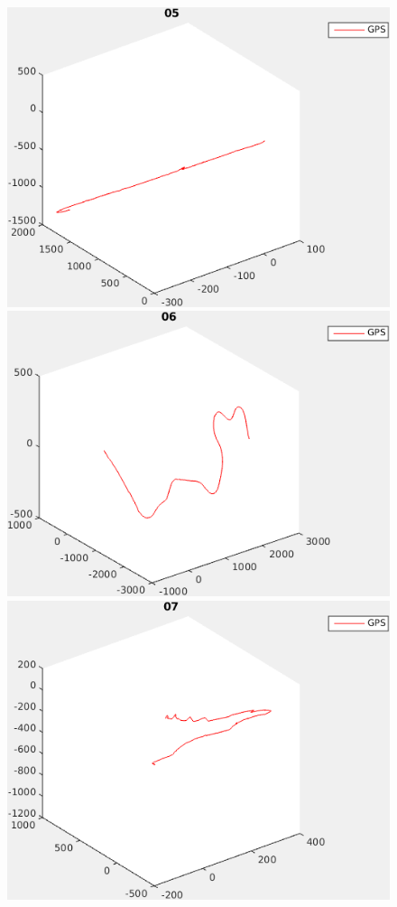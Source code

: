 \documentclass{report}
\begin{document}
\begin{figure}
\begin{minipage}[b]{.5\textwidth}
  \end{minipage}%
  \begin{minipage}[b]{.5\textwidth}
    \centering
    \includegraphics[width=.9\textwidth]{05_path}
  \end{minipage}
  \begin{minipage}[b]{.5\textwidth}
    \centering
    \includegraphics[width=.9\textwidth]{06_path}
  \end{minipage}%
  \begin{minipage}[b]{.5\textwidth}
    \centering
    \includegraphics[width=.9\textwidth]{07_path}
  \end{minipage}


\end{figure}
\end{document}
